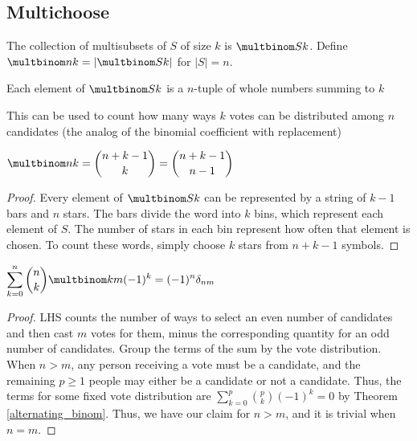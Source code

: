 \documentclass[a4paper]{article}
\begin{document}
\subsection{Multichoose}

\begin{definition}
The collection of multisubsets of $S$ of size $k$ is $\multbinom Sk$. Define $\multbinom nk=\left|\multbinom Sk\right|$ for $|S|=n$.
\begin{arrows}
\item Each element of $\multbinom Sk$ is a $n$-tuple of whole numbers summing to $k$
\item This can be used to count how many ways $k$ votes can be distributed among $n$ candidates (the analog of the binomial coefficient with replacement)
\end{arrows}
\end{definition}

\begin{theorem}
$\displaystyle \multbinom nk=\binom{n+k-1}k=\binom{n+k-1}{n-1}$

\begin{hl}
\begin{proof}
Every element of $\multbinom Sk$ can be represented by a string of $k-1$ bars and $n$ stars. The bars divide the word into $k$ bins, which represent each element of $S$. The number of stars in each bin represent how often that element is chosen. To count these words, simply choose $k$ stars from $n+k-1$ symbols.
\end{proof}
\end{hl}
\end{theorem}

\begin{theorem}
$\displaystyle\sum_{k=0}^n\binom nk\multbinom km(-1)^k=(-1)^n\delta_{nm}$

\begin{hl}
\begin{proof}
LHS counts the number of ways to select an even number of candidates and then cast $m$ votes for them, minus the corresponding quantity for an odd number of candidates. Group the terms of the sum by the vote distribution. When $n>m$, any person receiving a vote must be a candidate, and the remaining $p\geq 1$ people may either be a candidate or not a candidate. Thus, the terms for some fixed vote distribution are $\sum_{k=0}^p\binom pk(-1)^k=0$ by Theorem \ref{alternating_binom}. Thus, we have our claim for $n>m$, and it is trivial when $n=m$.
\end{proof}
\end{hl}
\end{theorem}
\end{document}
